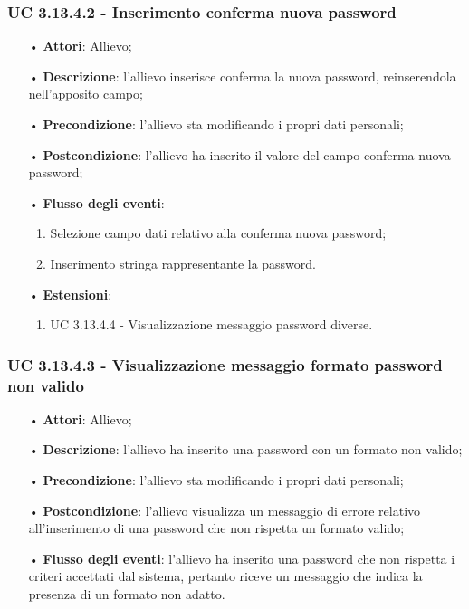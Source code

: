 \subsubsection{UC 3.13.4.2 - Inserimento conferma nuova password}
\begin{itemize}
	\item[•]\textbf{Attori}: Allievo;
	\item[•]\textbf{Descrizione}: l'allievo inserisce conferma la nuova password, reinserendola nell'apposito campo;
	\item[•]\textbf{Precondizione}: l'allievo sta modificando i propri dati personali;
	\item[•]\textbf{Postcondizione}: l'allievo ha inserito il valore del campo conferma nuova password; 
	\item[•]\textbf{Flusso degli eventi}: 
	\begin{enumerate}
		\item Selezione campo dati relativo alla conferma nuova password;
		\item Inserimento stringa rappresentante la password.
	\end{enumerate}
	\item[•]\textbf{Estensioni}:
	\begin{enumerate}
		\item UC 3.13.4.4 - Visualizzazione messaggio password diverse.
	\end{enumerate}
\end{itemize}

\subsubsection{UC 3.13.4.3 - Visualizzazione messaggio formato password non valido}
\begin{itemize}
	\item[•]\textbf{Attori}: Allievo;
	\item[•]\textbf{Descrizione}: l'allievo ha inserito una password con un formato non valido;
	\item[•]\textbf{Precondizione}: l'allievo sta modificando i propri dati personali;
	\item[•]\textbf{Postcondizione}: l'allievo visualizza un messaggio di errore relativo all'inserimento di una password che non rispetta un formato valido; 
	\item[•]\textbf{Flusso degli eventi}: l'allievo ha inserito una password che non rispetta i criteri accettati dal sistema, pertanto riceve un messaggio che indica la presenza di un formato non adatto.
\end{itemize}

